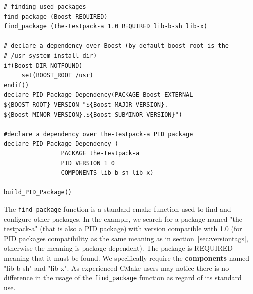 \documentclass[12pt,a4paper]{article}
\begin{document}
\begin{verbatim}
# finding used packages
find_package (Boost REQUIRED)
find_package (the-testpack-a 1.0 REQUIRED lib-b-sh lib-x)

# declare a dependency over Boost (by default boost root is the 
# /usr system install dir)
if(Boost_DIR-NOTFOUND)
     set(BOOST_ROOT /usr)
endif()
declare_PID_Package_Dependency(PACKAGE Boost EXTERNAL 
${BOOST_ROOT} VERSION "${Boost_MAJOR_VERSION}.
${Boost_MINOR_VERSION}.${Boost_SUBMINOR_VERSION}")

#declare a dependency over the-testpack-a PID package
declare_PID_Package_Dependency (
                PACKAGE the-testpack-a
                PID VERSION 1 0 
                COMPONENTS lib-b-sh lib-x)
                
build_PID_Package()
\end{verbatim}

The \texttt{find\_package} function is a standard cmake function used to find and configure other packages. In the example, we search for a package named "the-testpack-a" (that is also a PID package) with version compatible with 1.0 (for PID packages compatibility as the same meaning as in section~\ref{sec:versiontags}, otherwise the meaning is package dependent). The package is REQUIRED meaning that it must be found.  We specifically require the \textbf{components} named "lib-b-sh" and "lib-x". As experienced CMake users may notice there is no difference in the usage of the \texttt{find\_package} function as regard of its standard use. 
\end{document}
